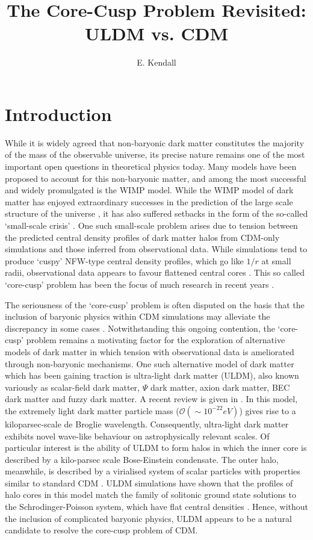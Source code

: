 \documentclass[a4paper,11pt]{article}
\title{\boldmath The Core-Cusp Problem Revisited: ULDM vs. CDM}
\author[1]{E. Kendall}
\affiliation[1]{Department of Physics, University of Auckland, Private Bag 92019, Auckland, New Zealand}
\begin{document}
\maketitle
\flushbottom

\section{Introduction}\label{sec:intro}

While it is widely agreed that non-baryonic dark matter constitutes the majority of the mass of the observable universe, its precise nature remains one of the most important open questions in theoretical physics today. Many models have been proposed to account for this non-baryonic matter, and among the most successful and widely promulgated is the WIMP model. While the WIMP model of dark matter has enjoyed extraordinary successes in the prediction of the large scale structure of the universe \cite{Springel:2005nw}, it has also suffered setbacks in the form of the so-called `small-scale crisis' \cite{Weinberg:2013aya}. One such small-scale problem arises due to tension between the predicted central density profiles of dark matter halos from CDM-only simulations and those inferred from observational data. While simulations tend to produce `cuspy' NFW-type central density profiles, which go like $1/r$ at small radii, observational data appears to favour flattened central cores \cite{REF} . This so called `core-cusp' problem has been the focus of much research in recent years \cite{Dutton:2018nop, Read:2018pft, Genina:2018}. 

The seriousness of the `core-cusp' problem is often disputed on the basis that the inclusion of baryonic physics within CDM simulations may alleviate the discrepancy in some cases \cite{Benitez-Llambay:2018}. Notwithstanding this ongoing contention, the `core-cusp' problem remains a motivating factor for the exploration of alternative models of dark matter in which tension with observational data is ameliorated through non-baryonic mechanisms. One such alternative model of dark matter which has been gaining traction is ultra-light dark matter (ULDM), also known variously as scalar-field dark matter, $\Psi$ dark matter, axion dark matter, BEC dark matter and fuzzy dark matter. A recent review is given in \cite{Hui:2016ltb}. In this model, the extremely light dark matter particle mass ($\mathcal{O}(\sim 10^{-22}eV)$) gives rise to a kiloparsec-scale de Broglie wavelength. Consequently, ultra-light dark matter exhibits novel wave-like behaviour on astrophysically relevant scales. Of particular interest is the ability of ULDM to form halos in which the inner core is described by a kilo-parsec scale Bose-Einstein condensate. The outer halo, meanwhile, is described by a virialised system of scalar particles with properties similar to standard CDM \cite{Schwabe:2016rze}. ULDM simulations have shown that the profiles of halo cores in this model match the family of solitonic ground state solutions to the Schrodinger-Poisson system, which have flat central densities \cite{Veltmaat:2018dfz}. Hence, without the inclusion of complicated baryonic physics, ULDM appears to be a natural candidate to resolve the core-cusp problem of CDM.
\end{document}
